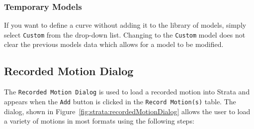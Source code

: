 \documentclass[12pt,oneside]{book}
\begin{document}
\subsubsection{Temporary Models}
If you want to define a curve without adding it to the library of models, simply select
\texttt{Custom} from the drop-down list.  Changing to the \texttt{Custom} model does not clear the
previous models data which allows for a model to be modified.

\subsection{Recorded Motion Dialog}\label{ch:strata:particulars:motionDialog}
The \texttt{Recorded Motion Dialog} is used to load a recorded motion into Strata and appears when
the \texttt{Add} button is clicked in the \texttt{Record Motion(s)} table.  The dialog, shown in
Figure~\ref{fig:strata:recordedMotionDialog} allows the user to load a variety of motions in most
formats using the following steps:
\end{document}
